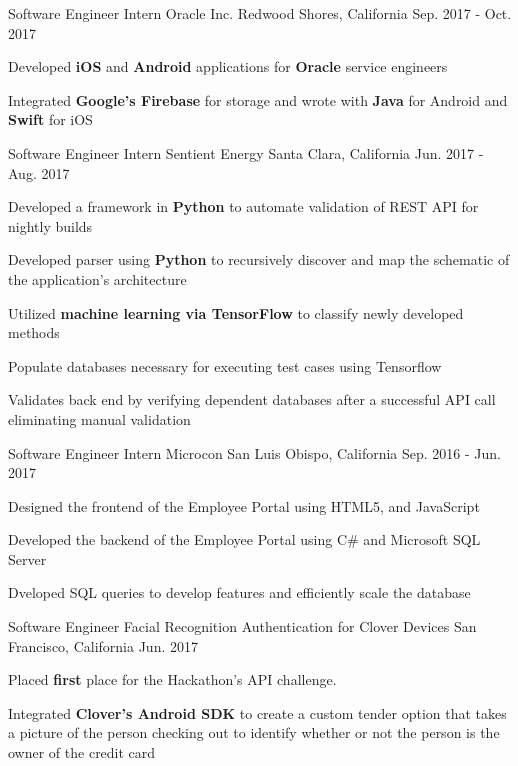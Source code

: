 \begin{cventries}
\cventry
{Software Engineer Intern}
{Oracle Inc.}
{Redwood Shores, California}
{Sep. 2017 - Oct. 2017}
{
\begin{cvitems}
\item {Developed \textbf{iOS} and \textbf{Android} applications for \textbf{Oracle} service engineers}
\item {Integrated \textbf{Google's Firebase} for storage and wrote with \textbf{Java} for Android and \textbf{Swift} for iOS}
\end{cvitems}
}

\cventry
{Software Engineer Intern} %
{Sentient Energy} %
{Santa Clara, California} %
{Jun. 2017 - Aug. 2017} %
{ %
\begin{cvitems}
\item {Developed a framework in \textbf{Python} to automate validation of REST API for nightly builds}
\item {Developed parser using \textbf{Python} to recursively discover and map the schematic of the application's architecture}
\item {Utilized \textbf{machine learning via TensorFlow} to classify newly developed methods}
\item {Populate databases necessary for executing test cases using Tensorflow} 
\item {Validates back end by verifying dependent databases after a successful API call eliminating manual validation}
\end{cvitems}
}


\cventry
{Software Engineer Intern} %
{Microcon} %
{San Luis Obispo, California} %
{Sep. 2016 - Jun. 2017} %
{ %
\begin{cvitems}
\item {Designed the frontend of the Employee Portal using HTML5, and JavaScript}
\item {Developed the backend of the Employee Portal using C\# and Microsoft SQL Server}
\item {Dveloped SQL queries to develop features and efficiently scale the database}
\end{cvitems}
}



\cventry
{Software Engineer} %
{Facial Recognition Authentication for Clover Devices} %
{San Francisco, California} %
{Jun. 2017} %
{ %
\begin{cvitems}
\item {Placed \textbf{first} place for the Hackathon's API challenge.}
\item {Integrated \textbf{Clover's Android SDK} to create a custom tender option that takes a picture of the person checking out to identify whether or not the person is the owner of the credit card}
\end{cvitems}
}

\end{cventries}
